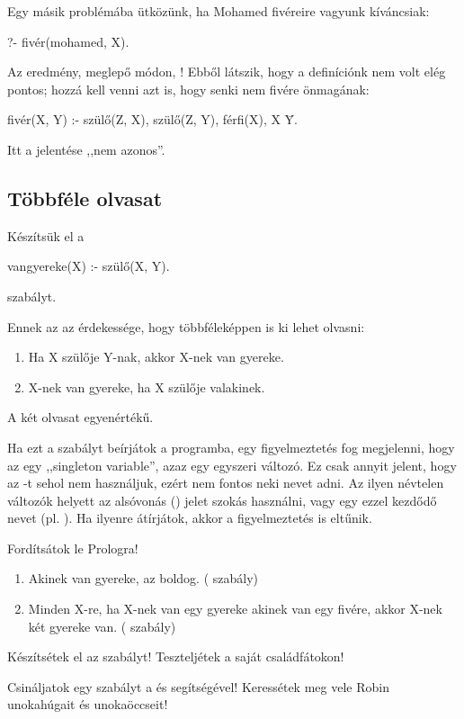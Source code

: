 Egy másik problémába ütközünk, ha Mohamed fivéreire vagyunk kíváncsiak:
\begin{prolog}
?- fivér(mohamed, X).
\end{prolog}
Az eredmény, meglepő módon, ! Ebből látszik, hogy a definíciónk nem volt elég pontos; hozzá kell venni azt is, hogy senki nem fivére önmagának:
\begin{prolog}
fivér(X, Y) :- szülő(Z, X), szülő(Z, Y), férfi(X), X \= Y.
\end{prolog}
Itt a \pr{\textbackslash=} jelentése ,,nem azonos''.

\subsection*{Többféle olvasat}

Készítsük el a
\begin{prolog}
vangyereke(X) :- szülő(X, Y).
\end{prolog}
szabályt.

Ennek az az érdekessége, hogy többféleképpen is ki lehet olvasni:

\begin{enumerate}
\item Ha X szülője Y-nak, akkor X-nek van gyereke.
\item X-nek van gyereke, ha X szülője valakinek.
\end{enumerate}
A két olvasat egyenértékű.

Ha ezt a szabályt beírjátok a programba, egy figyelmeztetés fog megjelenni, hogy az  egy ,,singleton variable'', azaz egy egyszeri változó. Ez csak annyit jelent, hogy az -t sehol nem használjuk, ezért nem fontos neki nevet adni. Az ilyen névtelen változók helyett az alsóvonás (\pr{\_}) jelet szokás használni, vagy egy ezzel kezdődő nevet (pl. ). Ha ilyenre átírjátok, akkor a figyelmeztetés is eltűnik.

\begin{problem}
Fordítsátok le Prologra!
\begin{enumerate}  
\item Akinek van gyereke, az boldog. ( szabály)
\item Minden X-re, ha X-nek van egy gyereke akinek van egy fivére, akkor X-nek két gyereke van. ( szabály)
\end{enumerate}
\end{problem}
\begin{problem}
  Készítsétek el az  szabályt! Teszteljétek a saját családfátokon!
\end{problem}
\begin{problem}
  Csináljatok egy  szabályt a  és  segítségével! Keressétek meg vele Robin unokahúgait és unokaöccseit!
\end{problem}


